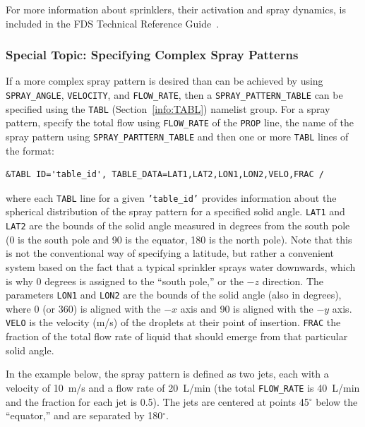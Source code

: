 \documentclass[11pt]{book}
\newcommand{\ct}{\tt\small}
\begin{document}
\noindent
For more information about sprinklers, their activation and spray dynamics, is included in the FDS
Technical Reference Guide~\cite{FDS_Tech_Guide_5}.

\subsubsection{Special Topic: Specifying Complex Spray Patterns}
\label{info:spraypattern}

If a more complex spray pattern is desired than can be achieved by using {\ct SPRAY\_ANGLE}, {\ct VELOCITY},
and {\ct FLOW\_RATE}, then a {\ct SPRAY\_PATTERN\_TABLE} can be specified using the {\ct TABL} (Section~\ref{info:TABL})
namelist group.  For a spray pattern, specify the total flow using {\ct FLOW\_RATE} of the {\ct PROP} line, the name of the spray pattern using
{\ct SPRAY\_PARTTERN\_TABLE} and then one or more {\ct TABL} lines of the format:

\footnotesize
\begin{verbatim}
&TABL ID='table_id', TABLE_DATA=LAT1,LAT2,LON1,LON2,VELO,FRAC /
\end{verbatim} \normalsize

\noindent
where each {\ct TABL} line for a given {\ct 'table\_id'} provides information about the spherical distribution of the spray pattern
for a specified solid angle. {\ct LAT1} and {\ct LAT2} are the bounds of the solid angle measured in degrees from
the south pole (0 is the south pole and 90 is the equator, 180 is the north pole).  Note that this is not the conventional way of
specifying a latitude, but rather a convenient system based on the fact that a typical sprinkler sprays water downwards, which is
why 0 degrees is assigned to the ``south pole,'' or the $-z$ direction. The parameters {\ct LON1} and {\ct LON2} are the
bounds of the solid angle (also in degrees),
where 0 (or 360) is aligned with the $-x$ axis and 90 is aligned with the $-y$ axis.  {\ct VELO} is the velocity (m/s) of the droplets at their
point of insertion.
{\ct FRAC} the fraction of the total flow rate of liquid that should emerge from that particular solid angle.

In the example below, the spray pattern is defined as two jets, each with a velocity of 10~m/s and a flow rate
of 20~L/min (the total {\ct FLOW\_RATE} is 40~L/min and the fraction for each jet is 0.5). The jets are centered at points 45$^\circ$ below the ``equator,'' and are separated
by 180$^\circ$.
\end{document}
